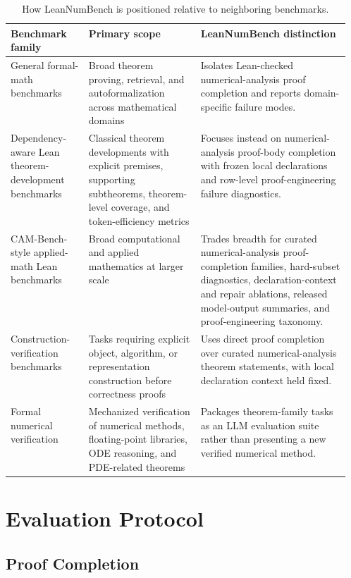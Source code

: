 \begin{table}[H]
\centering
\caption{How LeanNumBench is positioned relative to neighboring benchmarks.}
\label{tab:neighboring-benchmarks}
\small
\begin{tabularx}{\linewidth}{
  >{\raggedright\arraybackslash}p{0.23\linewidth}
  >{\raggedright\arraybackslash}p{0.33\linewidth}
  >{\raggedright\arraybackslash}X}
\toprule
Benchmark family & Primary scope & LeanNumBench distinction\\
\midrule
General formal-math benchmarks & Broad theorem proving,
retrieval, and autoformalization across mathematical domains & Isolates
Lean-checked numerical-analysis proof completion and reports
domain-specific failure modes.\\
Dependency-aware Lean theorem-development benchmarks & Classical theorem
developments with explicit premises, supporting subtheorems, theorem-level
coverage, and token-efficiency metrics & Focuses instead on numerical-analysis
proof-body completion with frozen local declarations and row-level
proof-engineering failure diagnostics.\\
CAM-Bench-style applied-math Lean benchmarks & Broad computational and
applied mathematics at larger scale & Trades breadth for curated
numerical-analysis proof-completion families, hard-subset diagnostics,
declaration-context and repair ablations, released model-output summaries, and
proof-engineering taxonomy.\\
Construction-verification benchmarks & Tasks requiring explicit object,
algorithm, or representation construction before correctness proofs & Uses
direct proof completion over curated numerical-analysis theorem statements,
with local declaration context held fixed.\\
Formal numerical verification & Mechanized verification of numerical methods,
floating-point libraries, ODE reasoning, and PDE-related theorems & Packages
theorem-family tasks as an LLM evaluation suite rather than presenting a new
verified numerical method.\\
\bottomrule
\end{tabularx}
\end{table}

\section{Evaluation Protocol}

\subsection{Proof Completion}

